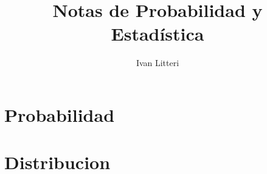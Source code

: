 \documentclass[hidelinks]{article}
\title{Notas de Probabilidad y Estadística}
\author{Ivan Litteri}
\date{}
\begin{document}
\maketitle
\tableofcontents
\clearpage

\section{Probabilidad}

\clearpage

\section{Distribucion}

\clearpage

% 

\printindex
\end{document}
